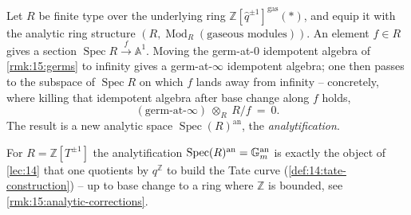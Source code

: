 \begin{definition}
\label{def:15:analytification}
Let $R$ be finite type over the underlying ring
$\mathbb{Z}[\widehat q^{\pm1}]^{\mathrm{gas}}(\ast)$, and equip it with the analytic
ring structure $(R, \operatorname{Mod}_R(\text{gaseous modules}))$. An element $f\in
R$ gives a section $\operatorname{Spec} R \xrightarrow{f} \mathbb{A}^1$. Moving the
germ-at-$0$ idempotent algebra of \cref{rmk:15:germs} to infinity gives a germ-at-$\infty$
idempotent algebra; one then passes to the subspace of $\operatorname{Spec} R$ on
which $f$ lands away from infinity -- concretely, where killing that idempotent
algebra after base change along $f$ holds,
\begin{equation}
\label{eq:15:analytic-condition}
(\text{germ-at-}\infty)\ \otimes_{R}\ R/f\ =\ 0 .
\end{equation}
The result is a new analytic space $\operatorname{Spec}(R)^{\mathrm{an}}$, the
\emph{analytification}.
\end{definition}

\begin{example}[Analytic $\Gm$]
\label{ex:15:gm-an}
For $R = \mathbb{Z}[T^{\pm1}]$ the analytification $\operatorname{Spec}(R)^{\mathrm{an}}
= \mathbb{G}_{m}^{\mathrm{an}}$ is exactly the object of \cref{lec:14} that one quotients by
$q^{\mathbb{Z}}$ to build the Tate curve (\cref{def:14:tate-construction}) -- up to
base change to a ring where $\mathbb{Z}$ is bounded, see \cref{rmk:15:analytic-corrections}.
\end{example}

